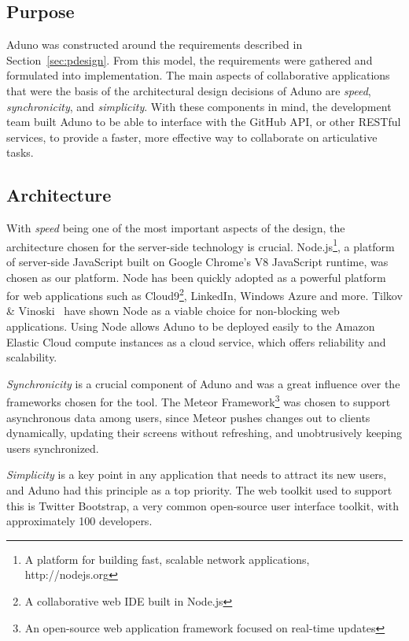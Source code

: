 \documentclass[conference]{IEEEtran}
\begin{document}
\subsection{Purpose}
Aduno was constructed around the requirements described in Section~\ref{sec:pdesign}.  From this model, the requirements were gathered and formulated into implementation.  The main aspects of collaborative applications that were the basis of the architectural design decisions of Aduno are \emph{speed}, \emph{synchronicity}, and \emph{simplicity}.  With these components in mind, the development team built Aduno to be able to interface with the GitHub API, or other RESTful services, to provide a faster, more effective way to collaborate on articulative tasks. 

\subsection{Architecture}
With \emph{speed} being one of the most important aspects of the design, the architecture chosen for the server-side technology is crucial.  Node.js\footnote{A platform for building fast, scalable network applications, http://nodejs.org}, a platform of server-side JavaScript built on Google Chrome's V8 JavaScript runtime, was chosen as our platform.  Node has been quickly adopted as a powerful platform for web applications such as Cloud9\footnote{A collaborative web IDE built in Node.js}, LinkedIn, Windows Azure and more.  Tilkov \& Vinoski~\cite{TV10} have shown Node as a viable choice for non-blocking web applications.  Using Node allows Aduno to be deployed easily to the Amazon Elastic Cloud compute instances as a cloud service, which offers reliability and scalability.

\emph{Synchronicity} is a crucial component of Aduno and was a great influence over the frameworks chosen for the tool.  The Meteor Framework\footnote{An open-source web application framework focused on real-time updates} was chosen to support asynchronous data among users, since Meteor pushes changes out to clients dynamically, updating their screens without refreshing, and unobtrusively keeping users synchronized.  

\emph{Simplicity} is a key point in any application that needs to attract its new users, and Aduno had this principle as a top priority.  The web toolkit used to support this is Twitter Bootstrap, a very common open-source user interface toolkit, with approximately 100 developers.
\end{document}
